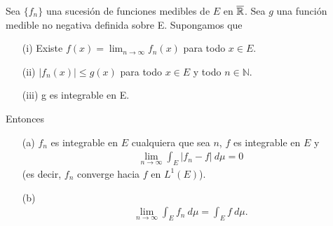 \begin{teo}
    Sea $\{f_n\}$ una sucesión de funciones medibles de $E$ en $\overline{\mathbb{R}}$. Sea $g$ una función medible no negativa definida sobre E. Supongamos que
    \begin{enumerate}
        \item[(i)] Existe $f(x) = \lim_{n \to \infty}{f_n(x)}$ para todo $x \in E$.
        \item[(ii)] $|f_n(x)| \leq g(x)$ para todo $x \in E$ y todo $n \in \mathbb{N}$.
        \item[(iii)] g es integrable en E.
    \end{enumerate}
    Entonces
    \begin{enumerate}
        \item[(a)] $f_n$ es integrable en $E$ cualquiera que sea $n$, $f$ es integrable en $E$ y
              \begin{align*}
                  \lim_{n \to \infty}{\int_{E}{|f_n - f| \ d\mu}} = 0
              \end{align*}
              (es decir, $f_n$ converge hacia $f$ en $L^1(E)$).
        \item[(b)]
              \begin{align*}
                  \lim_{n \to \infty}{\int_{E}{f_n \ d\mu}} = \int_{E}{f \ d\mu}.
              \end{align*}
    \end{enumerate}
\end{teo}

